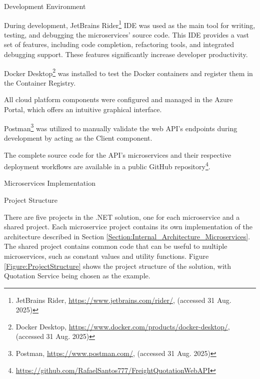 \documentclass[12pt, reqno]{amsbook}
\makeatletter
\def\section{\@startsection{section}{1}%
      \z@{.5\linespacing\@plus.7\linespacing}{.25\linespacing}%
      {\normalfont\bfseries\flushleft}}
\def\subsection{\@startsection{subsection}{2}%
      \z@{.5\linespacing\@plus.7\linespacing}{.25\linespacing}%
      {\normalfont\bfseries\flushleft}}
\theoremstyle{definition}
\theoremstyle{definition}
\numberwithin{section}{chapter}
\numberwithin{table}{chapter}
\numberwithin{figure}{chapter}
\makeatother
\begin{document}
\section{Development Environment}
\label{Section:Development_Environment}

During development, JetBrains Rider\footnote{JetBrains Rider, \url{https://www.jetbrains.com/rider/}, (accessed 31 Aug. 2025)} \ac{IDE} was used as the main tool for writing, testing, and debugging the microservices' source code. This \ac{IDE} provides a vast set of features, including code completion, refactoring tools, and integrated debugging support. These features significantly increase developer productivity.

Docker Desktop\footnote{Docker Desktop, \url{https://www.docker.com/products/docker-desktop/}, (accessed 31 Aug. 2025)} was installed to test the Docker containers and register them in the Container Registry.

All cloud platform components were configured and managed in the Azure Portal, which offers an intuitive graphical interface.

Postman\footnote{Postman, \url{https://www.postman.com/}, (accessed 31 Aug. 2025)} was utilized to manually validate the web \ac{API}'s endpoints during development by acting as the Client component.

The complete source code for the \ac{API}'s microservices and their respective deployment workflows are available in a public GitHub repository\footnote{\url{https://github.com/RafaelSantos777/FreightQuotationWebAPI}}.

\section{Microservices Implementation}
\label{Section:Microservices_Implementation}

\subsection{Project Structure}

There are five projects in the .NET solution, one for each microservice and a shared project. Each microservice project contains its own implementation of the architecture described in Section \ref{Section:Internal_Architecture_Microservices}. The shared project contains common code that can be useful to multiple microservices, such as constant values and utility functions.
Figure \ref{Figure:ProjectStructure} shows the project structure of the solution, with Quotation Service being chosen as the example.
\end{document}
